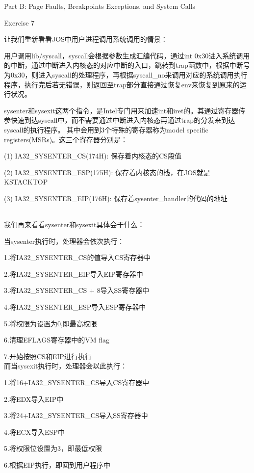 \documentclass[GBK,winfonts,a4paper,10pt]{ctexart}
\begin{document}
\begin{section}{ Part B: Page Faults, Breakpoints Exceptions, and System Calls }
\begin{subsection}{ Exercise 7 }
\end{subsection}

\begin{subsection}{ \color[rgb]{1,0,0}{Challenge 3: sysenter/sysexit} }
{\color[rgb]{1,0,0}
\par
让我们重新看看JOS中用户进程调用系统调用的情景：
\par
用户调用lib/syscall，syscall会根据参数生成汇编代码，通过int 0x30进入系统调用的中断，通过中断进入内核态的对应中断的入口，跳转到trap函数中，根据中断号为0x30，则进入syscall的处理程序，再根据syscall\_no来调用对应的系统调用执行程序，执行完后若无错误，则返回至trap部分直接通过恢复env来恢复到原来的运行状况。
\par
sysenter和sysexit这两个指令，是Intel专门用来加速int和iret的。其通过寄存器传参快速到达syscall中，而不需要通过中断进入内核态再通过trap的分发来到达syscall的执行程序。 其中会用到3个特殊的寄存器称为model specific registers(MSRs)。这三个寄存器分别是：\par
(1) IA32\_SYSENTER\_CS(174H): 保存着内核态的CS段值		\par
(2) IA32\_SYSENTER\_ESP(175H):	保存着内核态的栈，在JOS就是KSTACKTOP \par
(3) IA32\_SYSENTER\_EIP(176H):	保存着sysenter\_handler的代码的地址 \par  
}
~\\
我们再来看看sysenter和sysexit具体会干什么： 	\par
当sysenter执行时，处理器会依次执行： 			\par
1.将IA32\_SYSENTER\_CS的值导入CS寄存器中		\par
2.将IA32\_SYSENTER\_EIP导入EIP寄存器中		\par
3.将IA32\_SYSENTER\_CS + 8导入SS寄存器中		\par
4.将IA32\_SYSENTER\_ESP导入ESP寄存器中		\par
5.将权限为设置为0,即最高权限					\par
6.清理EFLAGS寄存器中的VM flag				\par
7.开始按照CS和EIP进行执行					\\
而当sysexit执行时，处理器会以此执行：			\par
1.将16+IA32\_SYSENTER\_CS导入CS寄存器中		\par
2.将EDX导入EIP中							\par
3.将24+IA32\_SYSENTER\_CS导入SS寄存器中		\par
4.将ECX导入ESP中							\par
5.将权限位设置为3，即最低权限				\par
6.根据EIP执行，即回到用户程序中				\par

\end{subsection}
\end{section}
\end{document}

